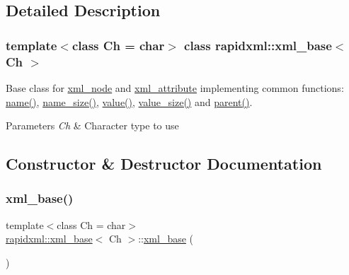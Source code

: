 \subsection{Detailed Description}
\subsubsection*{template$<$class Ch = char$>$\newline
class rapidxml\+::xml\+\_\+base$<$ Ch $>$}

Base class for \mbox{\hyperlink{classrapidxml_1_1xml__node}{xml\+\_\+node}} and \mbox{\hyperlink{classrapidxml_1_1xml__attribute}{xml\+\_\+attribute}} implementing common functions\+: \mbox{\hyperlink{classrapidxml_1_1xml__base_aef8ae147fbee59209f714274afc80dc4}{name()}}, \mbox{\hyperlink{classrapidxml_1_1xml__base_a20c8ffbe0c7a0b4231681ab8b99330a4}{name\+\_\+size()}}, \mbox{\hyperlink{classrapidxml_1_1xml__base_a6af65de5e59ac497cd69838f8a89d602}{value()}}, \mbox{\hyperlink{classrapidxml_1_1xml__base_a2eb123d471b1567fa4832b6ee2b75493}{value\+\_\+size()}} and \mbox{\hyperlink{classrapidxml_1_1xml__base_aa807062868d671a8c798d9d1bf016988}{parent()}}. 
\begin{DoxyParams}{Parameters}
{\em Ch} & Character type to use \\
\hline
\end{DoxyParams}


\subsection{Constructor \& Destructor Documentation}
\mbox{\label{classrapidxml_1_1xml__base_a23e7f7aac02d17a0a01afb597e4b966b}} 
\subsubsection{\texorpdfstring{xml\+\_\+base()}{xml\_base()}\hspace{0.1cm}{\footnotesize\ttfamily [1/2]}}
{\footnotesize\ttfamily template$<$class Ch  = char$>$ \\
\mbox{\hyperlink{classrapidxml_1_1xml__base}{rapidxml\+::xml\+\_\+base}}$<$ Ch $>$\+::\mbox{\hyperlink{classrapidxml_1_1xml__base}{xml\+\_\+base}} (\begin{DoxyParamCaption}{ }\end{DoxyParamCaption})\hspace{0.3cm}{\ttfamily [inline]}}

